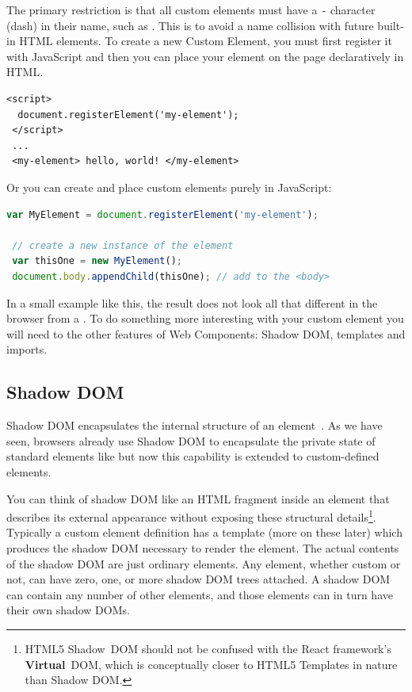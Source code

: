 The primary restriction is that all custom elements must have a \texttt{-} character (dash) in their name, such as . 
This is to avoid a name collision with future built-in HTML elements. 
To create a new Custom Element, you must first register it with JavaScript and then you can place your element on the page declaratively in HTML.

\begin{lstlisting}[language=HTML5,caption={Placing a custom element declaratively in HTML.},label=l:registerhtml]
 <script>
  document.registerElement('my-element');
 </script>
 ...
 <my-element> hello, world! </my-element>
\end{lstlisting}

Or you can create and place custom elements purely in JavaScript:

\begin{lstlisting}[language=JavaScript,caption={Placing a custom element imperatively in JavaScript\index{JavaScript}.},label=l:register]
 var MyElement = document.registerElement('my-element');

 // create a new instance of the element
 var thisOne = new MyElement();      
 document.body.appendChild(thisOne); // add to the <body>
\end{lstlisting}

In a small example like this, the result does not look all that different in the browser from a .
To do something more interesting with your custom element you will need to the other features of Web Components: Shadow DOM, templates and imports.

\subsection{Shadow DOM}
\label{bg:shadowdom}
Shadow DOM encapsulates the internal structure of an element~\cite{w3ccontributors2015}. 
As we have seen, browsers already use Shadow DOM to encapsulate the private state of standard elements like  but now this capability is extended to custom-defined elements.

You can think of shadow DOM like an HTML fragment inside an element that describes its external appearance without exposing these structural details\footnote{
HTML5 Shadow~DOM should not be confused with the React framework's \textbf{Virtual}~DOM, which is conceptually closer to HTML5 Templates in nature than Shadow DOM.}. 
Typically a custom element definition has a template (more on these later) which produces the shadow DOM necessary to render the element.
The actual contents of the shadow DOM are just ordinary elements.
Any element, whether custom or not, can have zero, one, or more shadow DOM trees attached.
A shadow DOM can contain any number of other elements, and those elements can in turn have their own shadow DOMs.

